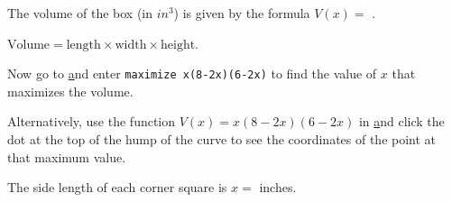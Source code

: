 \documentclass{ximera}
\begin{document}
\begin{question}
The volume of the box (in $\si{in^3}$) is given by the formula $V(x)=$ .
\begin{hint}
$\text{Volume}=\text{length}\times\text{width}\times\text{height}$.
\end{hint}

Now go to \href{http://wolframalpha.com} and enter \texttt{maximize x(8-2x)(6-2x)} to find the value of $x$ that maximizes the volume. 

Alternatively, use the function $V(x)=x(8-2x)(6-2x)$ in \href{http://desmos.com} and click the dot at the top of the hump of the curve to see the coordinates of the point at that maximum value.

The side length of each corner square is  $x=$  inches.

\end{question}
\end{document}
